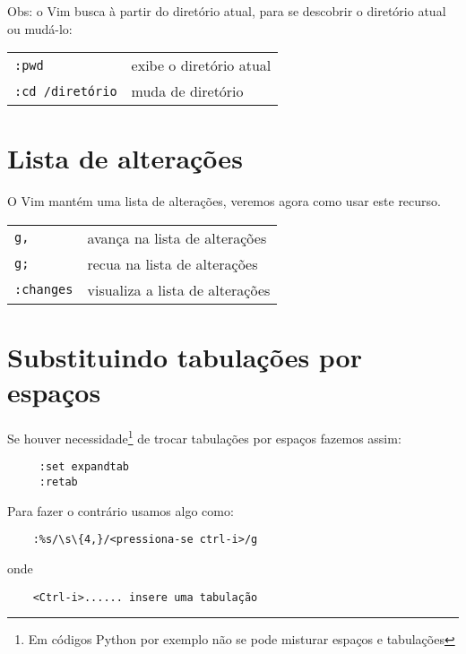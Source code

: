 Obs: o Vim busca à partir do diretório atual, para se descobrir 
o diretório atual ou mudá-lo:

\begin{table}[htb]\begin{center} \begin{tabular}{ll} \hline
    \verb|:pwd| & exibe o diretório atual\\
    \verb|:cd /diretório| &   muda de diretório\\
\hline \end{tabular}\end{center}\end{table}

\section{Lista de alterações}

O Vim mantém uma lista de alterações, veremos agora como usar este recurso.

\begin{table}[htb]\begin{center} \begin{tabular}{ll} \hline
     \verb|g,| &  avança na lista de alterações\\
     \verb|g;| & recua na lista de alterações\\
     \verb|:changes| & visualiza a lista de alterações\\
\hline \end{tabular}\end{center}\end{table}

\section{Substituindo tabulações por espaços}
\label{sec:Substituindo tabulações por espaços}

Se houver necessidade\footnote{Em códigos Python por exemplo não se pode
misturar espaços e tabulações} de trocar tabulações por espaços
fazemos assim:

\begin{verbatim}
	 :set expandtab
	 :retab
\end{verbatim}

Para fazer o contrário usamos algo como:

\begin{verbatim}
    :%s/\s\{4,}/<pressiona-se ctrl-i>/g
\end{verbatim}
onde
\begin{verbatim}
    <Ctrl-i>...... insere uma tabulação
\end{verbatim}

